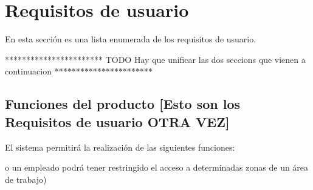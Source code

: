 \chapter{Requisitos de usuario}
    En esta sección es una lista enumerada de los requisitos de usuario.\newline

    ***********************\newline
    TODO Hay que unificar las dos seccions que vienen a continuacion\newline
    ***********************\newline

\section{Funciones del producto [Esto son los Requisitos de usuario OTRA VEZ]}

    El sistema permitirá la realización de las siguientes funciones:


  o un empleado podrá tener restringido el acceso a determinadas zonas de un área de trabajo)

   

